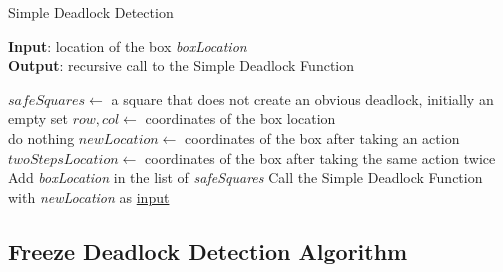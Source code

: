 \documentclass{article}
\begin{document}
\begin{algorithm}
    \caption{Simple Deadlock Detection}\label{euclid}
    \hspace*{\algorithmicindent} \textbf{Input}: location of the box \emph{boxLocation} \\
    \hspace*{\algorithmicindent} \textbf{Output}: recursive call to the Simple Deadlock Function \\
    \begin{algorithmic}
    \State $safeSquares \gets$ a square that does not create an obvious deadlock, initially an empty set
    \State $row, col \gets$ coordinates of the box location \\
        \State do nothing
    \EndIf 
        \State $newLocation \gets$ coordinates of the box after taking an action 
        \State $twoStepsLocation \gets$ coordinates of the box after taking the same action twice \\
            \State Add \emph{boxLocation} in the list of \emph{safeSquares} %
            \State Call the Simple Deadlock Function with \emph{newLocation} as \underline{input}
        \EndIf
    \EndFor
    \end{algorithmic}
\end{algorithm}


\subsection{Freeze Deadlock Detection Algorithm}
\end{document}
